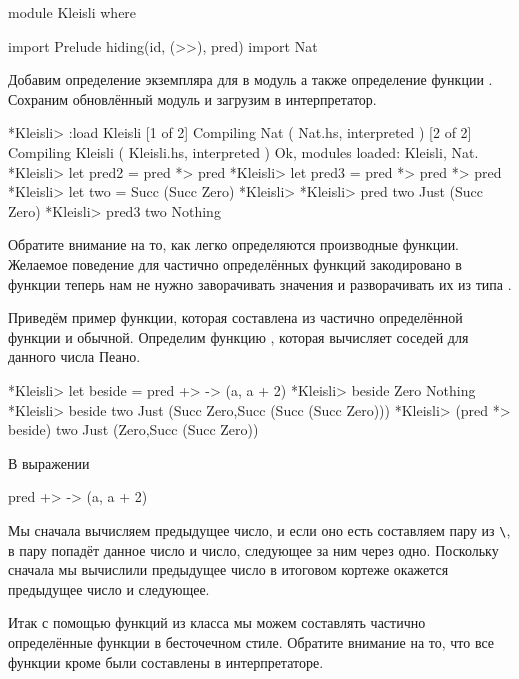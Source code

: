 \begin{code}
module Kleisli where
    
import Prelude hiding(id, (>>), pred)
import Nat
\end{code}

Добавим определение экземпляра  для  в модуль
 а также определение функции . Сохраним обновлённый
модуль и загрузим в интерпретатор.


\begin{code}
*Kleisli> :load Kleisli
[1 of 2] Compiling Nat              ( Nat.hs, interpreted )
[2 of 2] Compiling Kleisli          ( Kleisli.hs, interpreted )
Ok, modules loaded: Kleisli, Nat.
*Kleisli> let pred2 = pred *> pred
*Kleisli> let pred3 = pred *> pred *> pred
*Kleisli> let two   = Succ (Succ Zero)
*Kleisli> 
*Kleisli> pred two
Just (Succ Zero)
*Kleisli> pred3 two
Nothing
\end{code}

Обратите внимание на то, как легко определяются производные функции.
Желаемое поведение для частично определённых функций закодировано в
функции \In{(*>)} теперь нам не нужно заворачивать значения и
разворачивать их из типа .

Приведём пример функции, которая составлена из частично определённой
функции и обычной. Определим функцию , которая вычисляет
соседей для данного числа Пеано.


\begin{code}
*Kleisli> let beside = pred +> \a -> (a, a + 2)
*Kleisli> beside Zero
Nothing
*Kleisli> beside two
Just (Succ Zero,Succ (Succ (Succ Zero)))
*Kleisli> (pred *> beside) two
Just (Zero,Succ (Succ Zero))
\end{code}

В выражении


\begin{code}
pred +> \a -> (a, a + 2)
\end{code}

Мы сначала вычисляем предыдущее число, и если оно есть составляем пару
из \In{}\verb!\!, в пару попадёт данное число и число,
следующее за ним через одно. Поскольку сначала мы вычислили предыдущее
число в итоговом кортеже окажется предыдущее число и следующее.

Итак с помощью функций из класса  мы можем составлять
частично определённые функции в бесточечном стиле. Обратите внимание на
то, что все функции кроме  были составлены в интерпретаторе.


